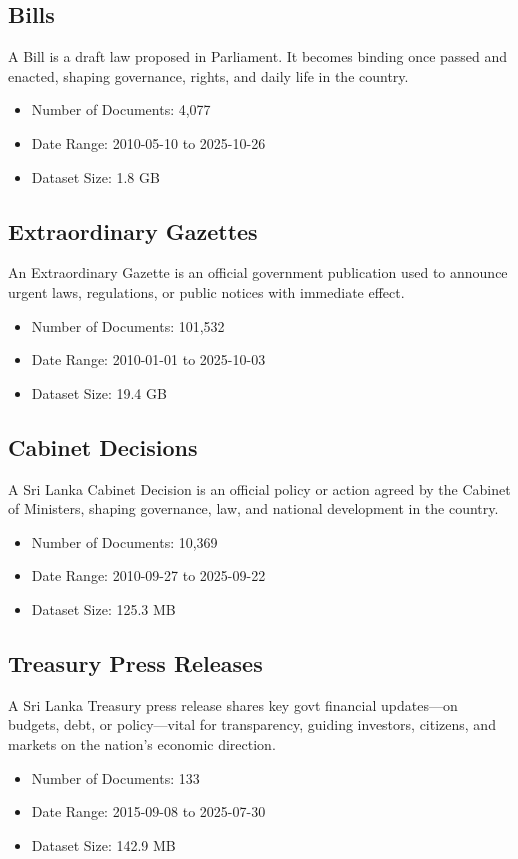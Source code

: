 \documentclass[10pt,a4paper]{article}%
\begin{document}
%
\subsection{Bills}%
\label{subsec:Bills}%
A Bill is a draft law proposed in Parliament. It becomes binding once passed and enacted, shaping governance, rights, and daily life in the country.%
\begin{itemize}%
\item%
Number of Documents: 4,077%
\item%
Date Range: 2010{-}05{-}10 to 2025{-}10{-}26%
\item%
Dataset Size: 1.8 GB%
\end{itemize}

%
\subsection{Extraordinary Gazettes}%
\label{subsec:ExtraordinaryGazettes}%
An Extraordinary Gazette is an official government publication used to announce urgent laws, regulations, or public notices with immediate effect.%
\begin{itemize}%
\item%
Number of Documents: 101,532%
\item%
Date Range: 2010{-}01{-}01 to 2025{-}10{-}03%
\item%
Dataset Size: 19.4 GB%
\end{itemize}

%
\subsection{Cabinet Decisions}%
\label{subsec:CabinetDecisions}%
A Sri Lanka Cabinet Decision is an official policy or action agreed by the Cabinet of Ministers, shaping governance, law, and national development in the country.%
\begin{itemize}%
\item%
Number of Documents: 10,369%
\item%
Date Range: 2010{-}09{-}27 to 2025{-}09{-}22%
\item%
Dataset Size: 125.3 MB%
\end{itemize}

%
\subsection{Treasury Press Releases}%
\label{subsec:TreasuryPressReleases}%
A Sri Lanka Treasury press release shares key govt financial updates—on budgets, debt, or policy—vital for transparency, guiding investors, citizens, and markets on the nation’s economic direction.%
\begin{itemize}%
\item%
Number of Documents: 133%
\item%
Date Range: 2015{-}09{-}08 to 2025{-}07{-}30%
\item%
Dataset Size: 142.9 MB%
\end{itemize}
\end{document}
